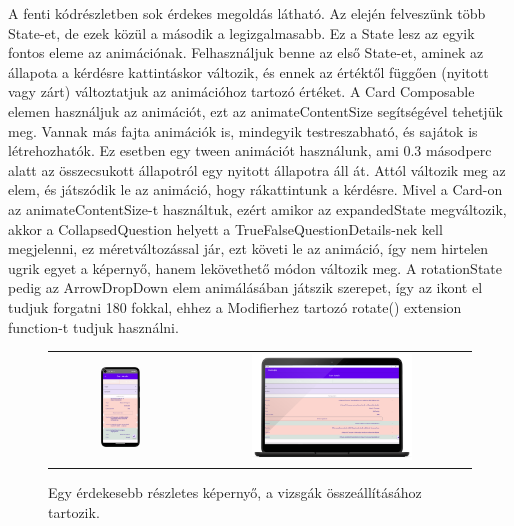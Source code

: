A fenti kódrészletben sok érdekes megoldás látható.
Az elején felveszünk több State-et, de ezek közül a második a legizgalmasabb. Ez a State lesz az egyik fontos eleme az animációnak.
Felhasználjuk benne az első State-et, aminek az állapota a kérdésre kattintáskor változik, és ennek az értéktől függően (nyitott vagy zárt) változtatjuk az animációhoz tartozó értéket.
A Card Composable elemen használjuk az animációt, ezt az animateContentSize segítségével tehetjük meg.
Vannak más fajta animációk is, mindegyik testreszabható, és sajátok is létrehozhatók. Ez esetben egy tween animációt használunk, ami 0.3 másodperc alatt az összecsukott állapotról egy nyitott állapotra áll át.
Attól változik meg az elem, és játszódik le az animáció, hogy rákattintunk a kérdésre.
Mivel a Card-on az animateContentSize-t használtuk, ezért amikor az expandedState megváltozik, akkor a CollapsedQuestion helyett a TrueFalseQuestionDetails-nek kell megjelenni, ez méretváltozással jár, ezt követi le az animáció, így nem hirtelen ugrik egyet a képernyő, hanem lekövethető módon változik meg.
A rotationState pedig az ArrowDropDown elem animálásában játszik szerepet, így az ikont el tudjuk forgatni 180 fokkal, ehhez a Modifierhez tartozó rotate() extension function-t tudjuk használni.

\begin{figure}[!ht]
    \centering
    \begin{tabular}{cc}
        \includegraphics[width=0.3\textwidth, keepaspectratio]{figures/Details_Android.png} & 
        \includegraphics[width=0.6\textwidth, keepaspectratio]{figures/Details_Desktop_framed.png}
    \end{tabular}
    \caption{Egy érdekesebb részletes képernyő, a vizsgák összeállításához tartozik.}
    \label{fig:DetailsScreen}
\end{figure}



